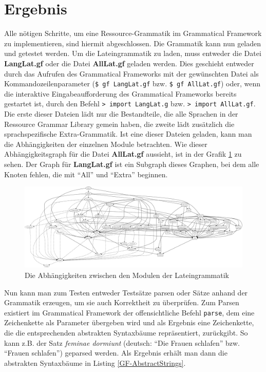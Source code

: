\section{Ergebnis}
Alle nötigen Schritte, um eine Ressource-Grammatik im Grammatical Framework zu implementieren, sind hiermit abgeschlossen. Die Grammatik kann nun geladen und getestet werden. Um die Lateingrammatik zu laden, muss entweder die Datei \textbf{LangLat.gf} oder die Datei \textbf{AllLat.gf} geladen werden. Dies geschieht entweder durch das Aufrufen des Grammatical Frameworks mit der gewünschten Datei als Kommandozeilenparameter (\texttt{\$ gf LangLat.gf} bzw. \texttt{\$ gf AllLat.gf}) oder, wenn die interaktive Eingabeaufforderung des Grammatical Frameworks bereits gestartet ist, durch den Befehl \texttt{> import LangLat.g} bzw. \texttt{> import AllLat.gf}. Die erste dieser Dateien lädt nur die Bestandteile, die alle Sprachen in der Ressource Grammar Library gemein haben, die zweite lädt zusätzlich die sprachspezifische Extra-Grammatik. Ist eine dieser Dateien geladen, kann man die Abhängigkeiten der einzelnen Module betrachten. Wie dieser Abhängigkeitsgraph für die Datei \textbf{AllLat.gf} aussieht, ist in der Grafik \ref{GF-DepGraph} zu sehen. Der Graph für \textbf{LangLat.gf} ist ein Subgraph dieses Graphen, bei dem alle Knoten fehlen, die mit ``All'' und ``Extra'' beginnen. \par
\begin{figure}
\includegraphics[scale=0.25]{graphics/LatinDependencyGraph.eps}
\caption{Die Abhängigkeiten zwischen den Modulen der Lateingrammatik}\label{GF-DepGraph}
\end{figure}
Nun kann man zum Testen entweder Testsätze parsen oder Sätze anhand der Grammatik erzeugen, um sie auch Korrektheit zu überprüfen. Zum Parsen existiert im Grammatical Framework der offensichtliche Befehl \texttt{parse}, dem eine Zeichenkette als Parameter übergeben wird und als Ergebnis eine Zeichenkette, die die entsprechenden abstrakten Syntaxbäume repräsentiert, zurückgibt. So kann z.B. der Satz \textit{feminae dormiunt} (deutsch: ``Die Frauen schlafen'' bzw. ``Frauen schlafen'') geparsed werden. Als Ergebnis erhält man dann die abstrakten Syntaxbäume in Listing \ref{GF-AbstractStrings}. 
